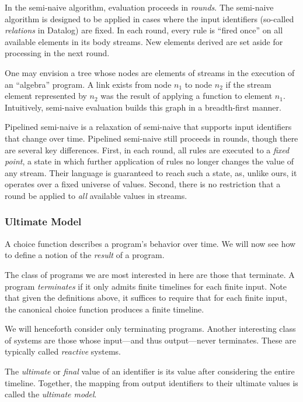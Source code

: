 In the semi-naive algorithm, evaluation proceeds in {\em rounds}.  The semi-naive algorithm is designed to be applied in cases where the input identifiers (so-called {\em relations} in Datalog) are fixed.  In each round, every rule is ``fired once'' on all available elements in its body streams.  New elements derived are set aside for processing in the next round.

One may envision a tree whose nodes are elements of streams in the execution of an ``algebra'' program.  A link exists from node $n_1$ to node $n_2$ if the stream element represented by $n_2$ was the result of applying a function to element $n_1$.  Intuitively, semi-naive evaluation builds this graph in a breadth-first manner.

Pipelined semi-naive is a relaxation of semi-naive that supports input identifiers that change over time.  Pipelined semi-naive still proceeds in rounds, though there are several key differences.  First, in each round, all rules are executed to a {\em fixed point}, a state in which further application of rules no longer changes the value of any stream.  Their language is guaranteed to reach such a state, as, unlike ours, it operates over a fixed universe of values.  Second, there is no restriction that a round be applied to {\em all} available values in streams.



\subsubsection{Ultimate Model}

A choice function describes a program's behavior over time.  We will now see how to define a notion of the {\em result} of a program.

The class of programs we are most interested in here are those that terminate.  A program {\em terminates} if it only admits finite timelines for each finite input.  Note that given the definitions above, it suffices to require that for each finite input, the canonical choice function produces a finite timeline.

We will henceforth consider only terminating programs. Another interesting class of systems are those whose input---and thus output---never terminates.  These are typically called {\em reactive} systems.

The {\em ultimate} or {\em final} value of an identifier is its value after considering the entire timeline.  Together, the mapping from output identifiers to their ultimate values is called the {\em ultimate model}.

